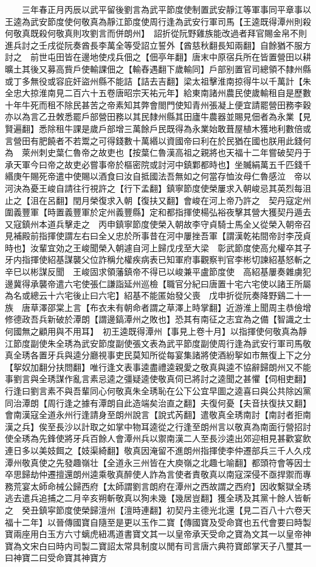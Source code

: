 　　三年春正月丙辰以武平留後劉言為武平節度使制置武安靜江等軍事同平章事以王逵為武安節度使何敬真為靜江節度使周行逢為武安行軍司馬【王逵既得潭州則殺何敬真既殺何敬真則攻劉言而併朗州】　詔折從阮野雞族能改過者拜官賜金帛不則進兵討之壬戌從阮奏酋長李萬全等受詔立誓外【酋慈秋翻長知兩翻】自餘猶不服方討之　前世屯田皆在邊地使戍兵佃之【佃亭年翻】唐末中原宿兵所在皆置營田以耕曠土其後又募高貲戶使輸課佃之【輸舂遇翻下歲輸同】戶部别置官司總領不隸州縣或丁多無役或容庇奸盜州縣不能詰【詰去吉翻】梁太祖擊淮南掠得牛以千萬計【朱全忠大掠淮南見二百六十五卷唐昭宗天祐元年】給東南諸州農民使歲輸租自是歷數十年牛死而租不除民甚苦之帝素知其弊會閤門使知青州張凝上便宜請罷營田務李穀亦以為言乙丑敇悉罷戶部營田務以其民隸州縣其田廬牛農器並賜見佃者為永業【見賢遍翻】悉除租牛課是歲戶部增三萬餘戶民既得為永業始敢葺屋植木獲地利數倍或言營田有肥饒者不若鬻之可得錢數十萬緡以資國帝曰利在於民猶在國也朕用此錢何為　萊州刺史葉仁魯帝之故吏也【按葉仁魯漢高祖之親將也天福十二年嘗破契丹于承天軍今曰帝之故吏必嘗事帝於樞密院或討河中鎮鄴都時也】坐贓絹萬五千匹錢千緡庚午賜死帝遣中使賜以酒食曰汝自抵國法吾無如之何當存恤汝母仁魯感泣　帝以河決為憂王峻自請往行視許之【行下孟翻】鎮寧節度使榮屢求入朝峻忌其英烈每沮止之【沮在呂翻】閏月榮復求入朝【復扶又翻】會峻在河上帝乃許之　契丹寇定州圍義豐軍【時置義豐軍於定州義豐縣】定和都指揮使楊弘裕夜擊其營大獲契丹遁去又寇鎮州本道兵擊走之　丙申鎮寧節度使榮入朝故李守貞騎士馬全乂從榮入朝帝召見補殿前指揮使謂左右曰全乂忠於所事昔在河中屢挫吾軍【謂漢乾祐間帝討李茂貞時也】汝輩宜効之王峻聞榮入朝遽自河上歸戊戌至大梁　彰武節度使高允權卒其子牙内指揮使紹基謀襲父位詐稱允權疾病表已知軍府事觀察判官李彬切諫紹基怒斬之辛巳以彬謀反聞　王峻固求領藩鎮帝不得已以峻兼平盧節度使　高紹基屢奏雜虜犯邊冀得承襲帝遣六宅使張仁謙詣延州巡檢【職官分紀曰唐置十宅六宅使以諸王所屬為名或總云十六宅後止曰六宅】紹基不能匿始發父喪　戊申折從阮奏降野鷄二十一族　唐草澤邵棠上言【布衣未有朝命者謂之草澤上時掌翻】近游淮上聞周主恭儉增修德政吾兵新破於潭朗【謂邊鎬潭州之敗也】恐其有南征之志宜為之備【智識之士何國無之顧用與不用耳】　初王逵既得潭州【事見上卷十月】以指揮使何敬真為靜江節度副使朱全琇為武安節度副使張文表為武平節度副使周行逢為武安行軍司馬敬真全琇各置牙兵與逵分廳視事吏民莫知所從每宴集諸將使酒紛挐如市無復上下之分【挐奴加翻分扶問翻】唯行逢文表事逵盡禮逵親愛之敬真與逵不協辭歸朗州又不能事劉言與全琇謀作亂言素忌逵之彊疑逵使敬真伺已將討之逵聞之甚懼【伺相吏翻】行逢曰劉言素不與吾輩同心何敬真朱全琇恥在公下公宜早圖之逵喜曰與公共除凶黨同治潭朗【周行逢之據有潭朗自此造端矣治直之翻】夫復何憂【夫音扶復扶又翻】會南漢寇全道永州行逢請身至朗州說言【說式芮翻】遣敬真全琇南討【南討者拒南漢之兵】俟至長沙以計取之如掌中物耳逵從之行逢至朗州言以敬真為南面行營招討使全琇為先鋒使將牙兵百餘人會潭州兵以禦南漢二人至長沙逵出郊迎相見甚歡宴飲連日多以美妓餌之【妓渠綺翻】敬真因淹留不進朗州指揮使李仲遷部兵三千人久戍潭州敬真使之先發趣嶺壮【全道永三州皆在大庾嶺之北趣七喻翻】都頭符會等因士卒思歸劫仲遷擅還朗州逵乘敬真醉使人詐為言使者責敬真以南寇深侵不亟捍禦而專務荒宴太師命械公歸西府【太師謂劉言朗府在潭州之西故謂之西府】因收繫獄全琇逃去遣兵追捕之二月辛亥朔斬敬真以狥未幾【幾居豈翻】獲全琇及其黨十餘人皆斬之　癸丑鎮寜節度使榮歸澶州【澶時連翻】初契丹主德光北還【見二百八十六卷天福十二年】以晉傳國寶自隨至是更以玉作二寶【傳國寶及受命寶也五代會要曰時製寶兩座用白玉方六寸螭虎紐馮道書寶文其一以皇帝承天受命之寶為文其一以皇帝神寶為文宋白曰時内司製二寶詔太常具制度以閒有司言唐六典符寶郎掌天子八璽其一曰神寶二曰受命寶其神寶方